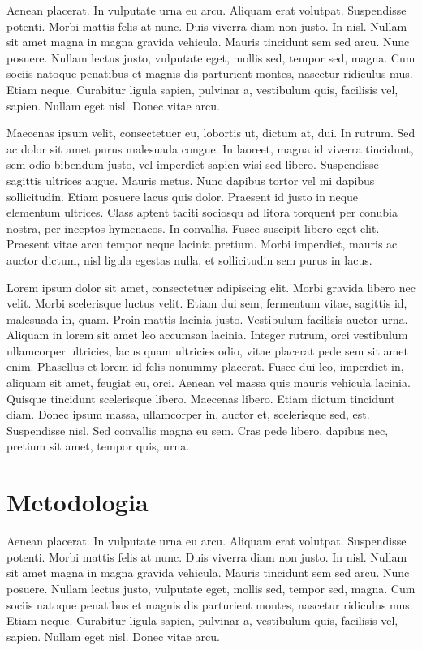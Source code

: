 Aenean placerat. In vulputate urna eu arcu. Aliquam erat volutpat. Suspendisse potenti. Morbi mattis felis at nunc. Duis viverra diam non justo. In nisl. Nullam sit amet magna in magna gravida vehicula. Mauris tincidunt sem sed arcu. Nunc posuere. Nullam lectus justo, vulputate eget, mollis sed, tempor sed, magna. Cum sociis natoque penatibus et magnis dis parturient montes, nascetur ridiculus mus. Etiam neque. Curabitur ligula sapien, pulvinar a, vestibulum quis, facilisis vel, sapien. Nullam eget nisl. Donec vitae arcu.

Maecenas ipsum velit, consectetuer eu, lobortis ut, dictum at, dui. In rutrum. Sed ac dolor sit amet purus malesuada congue. In laoreet, magna id viverra tincidunt, sem odio bibendum justo, vel imperdiet sapien wisi sed libero. Suspendisse sagittis ultrices augue. Mauris metus. Nunc dapibus tortor vel mi dapibus sollicitudin. Etiam posuere lacus quis dolor. Praesent id justo in neque elementum ultrices. Class aptent taciti sociosqu ad litora torquent per conubia nostra, per inceptos hymenaeos. In convallis. Fusce suscipit libero eget elit. Praesent vitae arcu tempor neque lacinia pretium. Morbi imperdiet, mauris ac auctor dictum, nisl ligula egestas nulla, et sollicitudin sem purus in lacus.

Lorem ipsum dolor sit amet, consectetuer adipiscing elit. Morbi gravida libero nec velit. Morbi scelerisque luctus velit. Etiam dui sem, fermentum vitae, sagittis id, malesuada in, quam. Proin mattis lacinia justo. Vestibulum facilisis auctor urna. Aliquam in lorem sit amet leo accumsan lacinia. Integer rutrum, orci vestibulum ullamcorper ultricies, lacus quam ultricies odio, vitae placerat pede sem sit amet enim. Phasellus et lorem id felis nonummy placerat. Fusce dui leo, imperdiet in, aliquam sit amet, feugiat eu, orci. Aenean vel massa quis mauris vehicula lacinia. Quisque tincidunt scelerisque libero. Maecenas libero. Etiam dictum tincidunt diam. Donec ipsum massa, ullamcorper in, auctor et, scelerisque sed, est. Suspendisse nisl. Sed convallis magna eu sem. Cras pede libero, dapibus nec, pretium sit amet, tempor quis, urna.


\section{Metodologia}

Aenean placerat. In vulputate urna eu arcu. Aliquam erat volutpat. Suspendisse potenti. Morbi mattis felis at nunc. Duis viverra diam non justo. In nisl. Nullam sit amet magna in magna gravida vehicula. Mauris tincidunt sem sed arcu. Nunc posuere. Nullam lectus justo, vulputate eget, mollis sed, tempor sed, magna. Cum sociis natoque penatibus et magnis dis parturient montes, nascetur ridiculus mus. Etiam neque. Curabitur ligula sapien, pulvinar a, vestibulum quis, facilisis vel, sapien. Nullam eget nisl. Donec vitae arcu.

